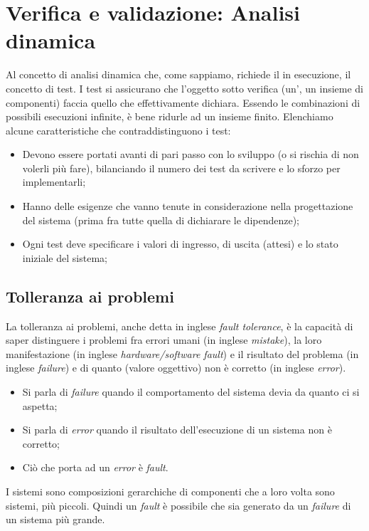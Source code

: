\documentclass[../main]{subfiles}
\begin{document}
\section{Verifica e validazione: Analisi dinamica}
Al concetto di analisi dinamica che, come sappiamo, richiede il  in esecuzione, il concetto di test.
I test si assicurano che l'oggetto sotto verifica (un', un insieme di componenti) faccia quello che effettivamente dichiara. Essendo le combinazioni di possibili esecuzioni infinite, è bene ridurle ad un insieme finito.\newline
Elenchiamo alcune caratteristiche che contraddistinguono i test:
\begin{itemize}
    \item Devono essere portati avanti di pari passo con lo sviluppo (o si rischia di non volerli più fare), bilanciando il numero dei test da scrivere e lo sforzo per implementarli;
    \item Hanno delle esigenze che vanno tenute in considerazione nella progettazione del sistema (prima fra tutte quella di dichiarare le dipendenze);
    \item Ogni test deve specificare i valori di ingresso, di uscita (attesi) e lo stato iniziale del sistema;
\end{itemize}
\subsection{Tolleranza ai problemi}
La tolleranza ai problemi, anche detta in inglese \textit{fault tolerance}, è la capacità di saper distinguere i problemi fra errori umani (in inglese \textit{mistake}), la loro manifestazione (in inglese \textit{hardware/software fault}) e il risultato del problema (in inglese \textit{failure}) e di quanto (valore oggettivo) non è corretto (in inglese \textit{error}).
\begin{itemize}
    \item Si parla di \textit{failure} quando il comportamento del sistema devia da quanto ci si aspetta;
    \item Si parla di \textit{error} quando il risultato dell'esecuzione di un sistema non è corretto;
    \item Ciò che porta ad un \textit{error} è \textit{fault}.
\end{itemize}
I sistemi sono composizioni gerarchiche di componenti che a loro volta sono sistemi, più piccoli. Quindi un \textit{fault} è possibile che sia generato da un \textit{failure} di un sistema più grande.
\end{document}
